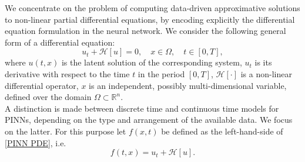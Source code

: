 We concentrate on the problem of computing data-driven approximative solutions to non-linear partial differential equations, by encoding explicitly the differential equation formulation in the neural network. We consider the following general form of a differential equation:
\begin{equation}
    \label{PINN PDE}
    u_t + \mathcal{H} \left[ u \right] = 0, \quad x \in \Omega, \quad t \in \left[ 0, T \right], 
\end{equation}
where $u(t,x)$ is the latent solution of the corresponding system, $u_t$ is its derivative with respect to the time $t$ in the period $\left[ 0, T \right]$, $\mathcal{H} \left[ \cdot \right]$ is a non-linear differential operator, $x$ is an independent, possibly multi-dimensional variable, defined over the domain $\Omega \subset \mathbb{R}^{n}$. \\
A distinction is made between discrete time and continuous time models for PINNs, depending on the type and arrangement of the available data. We focus on the latter. For this purpose let $f(x,t)$ be defined as the left-hand-side of \cref{PINN PDE}, i.e.
\begin{equation}
    \label{Residual Network}
    f(t,x) = u_t + \mathcal{H} \left[ u \right].
\end{equation}
